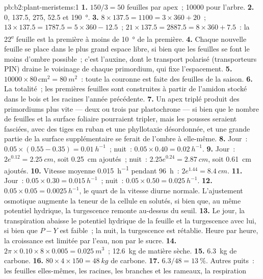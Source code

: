 \begin{solution}{pb:b2:plant-meristems:1}
\textbf{1.} $150/3 = 50$ feuilles par apex~; \num{10000} pour l'arbre.
\textbf{2.} 0, 137.5, 275, 52.5 et \qty{190}{\degree}.
\textbf{3.} $8\times 137.5 = 1100 = 3\times 360 + 20$~; $13\times 137.5
= 1787.5 = 5\times 360 - 12.5$~; $21\times 137.5 = 2887.5 = 8\times 360
+ 7.5$~: la 22\textsuperscript{e} feuille est la première à moins de
\qty{10}{\degree} de la première.
\textbf{4.} Chaque nouvelle feuille se place dans le plus grand espace
libre, si bien que les feuilles se font le moins d'ombre possible~;
c'est l'auxine, dont le transport polarisé (transporteurs PIN) draine
le voisinage de chaque primordium, qui fixe l'espacement.
\textbf{5.} $\num{10000}\times 80\,\text{cm}^{2} = \qty{80}{m^2}$~: toute
la couronne est faite des feuilles de la saison.
\textbf{6.} La totalité~; les premières feuilles sont construites à
partir de l'amidon stocké dans le bois et les racines l'année
précédente.
\textbf{7.} Un apex triplé produit des primordiums plus vite --- deux ou
trois par plastochrone --- si bien que le nombre de feuilles et la
surface foliaire pourraient tripler, mais les pousses seraient
fasciées, avec des tiges en ruban et une phyllotaxie désordonnée, et une
grande partie de la surface supplémentaire se ferait de l'ombre à
elle-même.
\textbf{8.} Jour~: $0.05\times(0.55 - 0.35) = \qty{0.01}{h^{-1}}$~;
nuit~: $0.05\times 0.40 = \qty{0.02}{h^{-1}}$.
\textbf{9.} Jour~: $2e^{0.12} = \qty{2.25}{cm}$, soit \qty{0.25}{cm}
ajoutés~; nuit~: $2.25e^{0.24} = \qty{2.87}{cm}$, soit \qty{0.61}{cm}
ajoutés.
\textbf{10.} Vitesse moyenne \qty{0.015}{h^{-1}} pendant \qty{96}{h}~:
$2e^{1.44}
= \qty{8.4}{cm}$.
\textbf{11.} Jour~: $0.05\times 0.30 = \qty{0.015}{h^{-1}}$~; nuit~:
$0.05\times 0.50 = \qty{0.025}{h^{-1}}$.
\textbf{12.} $0.05\times 0.05 = \qty{0.0025}{h^{-1}}$, le quart de la
vitesse diurne normale. L'ajustement osmotique augmente la teneur de la
cellule en solutés, si bien que, au même potentiel hydrique, la
turgescence remonte au-dessus du seuil.
\textbf{13.} Le jour, la transpiration abaisse le potentiel hydrique de
la feuille et la turgescence avec lui, si bien que $P - Y$ est faible~;
la nuit, la turgescence est rétablie. Heure par heure, la croissance est
limitée par l'eau, non par le sucre.
\textbf{14.} $2\pi\times 0.10\times 8\times 0.005 = \qty{0.025}{m^3}$~;
\qty{12.6}{kg} de matière sèche.
\textbf{15.} \qty{6.3}{kg} de carbone.
\textbf{16.} $80\times 4\times 150 = \qty{48}{kg}$ de carbone.
\textbf{17.} $6.3/48 = \qty{13}{\%}$. Autres puits~: les feuilles
elles-mêmes, les racines, les branches et les rameaux, la respiration

\end{solution}
